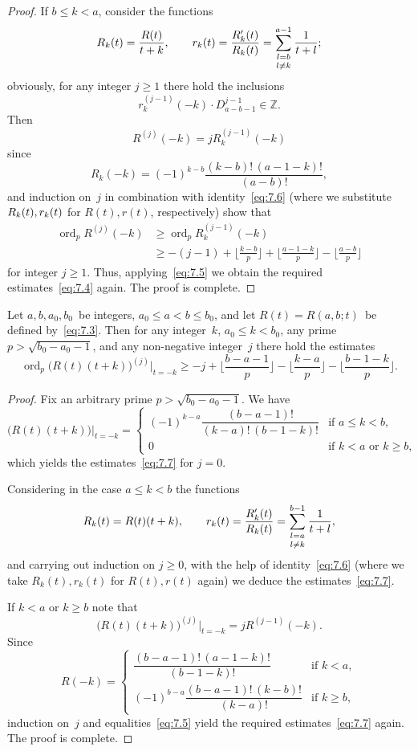\documentclass[a4paper,twoside]{article}
\numberwithin{equation}{section}
\renewcommand{\[}{\lfloor}
\renewcommand{\]}{\rfloor}
\newcommand{\<}{\langle}
\renewcommand{\>}{\rangle}
\DeclareMathOperator{\ord}{ord}
\newcommand{\rom}[1]{{\rm#1}}
\newcommand{\doublesb}[2]{_{\genfrac{}{}{0pt}{1}{#1}{#2}}}
\begin{document}
\begin{proof}
If $b\le k<a$, consider the functions
$$
R_k(t)=\frac{R(t)}{t+k},
\qquad
r_k(t)=\frac{R_k'(t)}{R_k(t)}
=\sum\doublesb{l=b}{l\ne k}^{a-1}\frac1{t+l};
$$
obviously, for any integer $j\ge1$ there hold the inclusions
$$
r_k^{(j-1)}(-k)\cdot D_{a-b-1}^{j-1}\in\mathbb Z.
$$
Then
$$
R^{(j)}(-k)=jR_k^{(j-1)}(-k)
$$
since
$$
R_k(-k)=(-1)^{k-b}\frac{(k-b)!\,(a-1-k)!}{(a-b)!},
$$
and induction on~$j$ in combination with identity~\eqref{eq:7.6}
(where we substitute $R_k(t),\linebreak[2]r_k(t)$
for $R(t),r(t)$, respectively)
show that
\begin{align*}
\ord_pR^{(j)}(-k)
&\ge\ord_pR_k^{(j-1)}(-k)
\\
&\ge-(j-1)+\biggl\[\frac{k-b}p\biggr\]
+\biggl\[\frac{a-1-k}p\biggr\]-\biggl\[\frac{a-b}p\biggr\]
\end{align*}
for integer $j\ge1$. Thus, applying~\eqref{eq:7.5}
we obtain the required estimates~\eqref{eq:7.4} again.
The proof is complete.
\end{proof}

\begin{lemma}
\label{lem:18}
Let $a,b,a_0,b_0$~be integers\rom, $a_0\le a<b\le b_0$\rom, and
let $R(t)= R(a,b;t)$~be defined by~\eqref{eq:7.3}.
Then for any integer~$k$\rom, $a_0\le k<b_0$\rom,
any prime $p>\sqrt{b_0-a_0-1}$\rom, and any non-negative integer~$j$
there hold the estimates
\begin{equation}
\ord_p\bigl(R(t)(t+k)\bigr)^{(j)}\big|_{t=-k}
\ge-j+\biggl\[\frac{b-a-1}p\biggr\]
-\biggl\[\frac{k-a}p\biggr\]-\biggl\[\frac{b-1-k}p\biggr\].
\label{eq:7.7}
\end{equation}
\end{lemma}

\begin{proof}
Fix an arbitrary prime $p>\sqrt{b_0-a_0-1}$. We have
$$
\bigl(R(t)(t+k)\bigr)\big|_{t=-k}=\begin{cases}
(-1)^{k-a}\dfrac{(b-a-1)!}{(k-a)!\,(b-1-k)!}
& \mbox{if $a\le k<b$}, \\
0 & \mbox{if $k<a$ or $k\ge b$},
\end{cases}
$$
which yields the estimates~\eqref{eq:7.7} for $j=0$.

Considering in the case $a\le k<b$ the functions
$$
R_k(t)=R(t)(t+k),
\qquad
r_k(t)=\frac{R_k'(t)}{R_k(t)}
=\sum\doublesb{l=a}{l\ne k}^{b-1}\frac1{t+l},
$$
and carrying out induction on $j\ge0$,
with the help of identity~\eqref{eq:7.6}
(where we take $R_k(t),r_k(t)$ for
$R(t),r(t)$ again) we deduce the estimates~\eqref{eq:7.7}.

If $k<a$ or $k\ge b$ note that
$$
\bigl(R(t)(t+k)\bigr)^{(j)}\big|_{t=-k}
=jR^{(j-1)}(-k).
$$
Since
$$
R(-k)=\begin{cases}
\dfrac{(b-a-1)!\,(a-1-k)!}{(b-1-k)!}
& \mbox{if $k<a$}, \\
(-1)^{b-a}\dfrac{(b-a-1)!\,(k-b)!}{(k-a)!}
& \mbox{if $k\ge b$},
\end{cases}
$$
induction on~$j$ and equalities~\eqref{eq:7.5} yield
the required estimates~\eqref{eq:7.7} again.
The proof is complete.
\end{proof}
\end{document}
